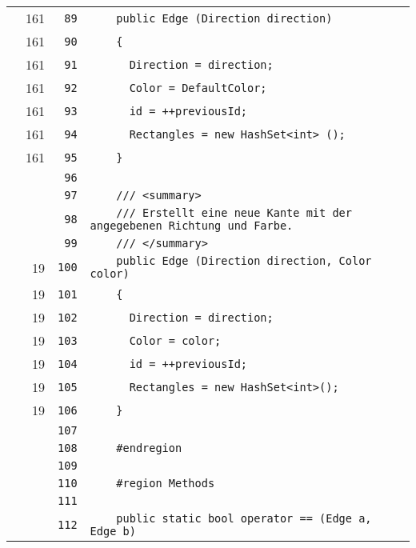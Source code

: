 \documentclass[a4paper,10pt]{article}
\begin{document}
\begin{longtable}[l]{lrrl}
\cellcolor{green} & 161 & \verb~89~ & \verb~    public Edge (Direction direction)~\\
\cellcolor{green} & 161 & \verb~90~ & \verb~    {~\\
\cellcolor{green} & 161 & \verb~91~ & \verb~      Direction = direction;~\\
\cellcolor{green} & 161 & \verb~92~ & \verb~      Color = DefaultColor;~\\
\cellcolor{green} & 161 & \verb~93~ & \verb~      id = ++previousId;~\\
\cellcolor{green} & 161 & \verb~94~ & \verb~      Rectangles = new HashSet<int> ();~\\
\cellcolor{green} & 161 & \verb~95~ & \verb~    }~\\
\cellcolor{gray} &  & \verb~96~ & \verb~~\\
\cellcolor{gray} &  & \verb~97~ & \verb~    /// <summary>~\\
\cellcolor{gray} &  & \verb~98~ & \verb~    /// Erstellt eine neue Kante mit der angegebenen Richtung und Farbe.~\\
\cellcolor{gray} &  & \verb~99~ & \verb~    /// </summary>~\\
\cellcolor{green} & 19 & \verb~100~ & \verb~    public Edge (Direction direction, Color color)~\\
\cellcolor{green} & 19 & \verb~101~ & \verb~    {~\\
\cellcolor{green} & 19 & \verb~102~ & \verb~      Direction = direction;~\\
\cellcolor{green} & 19 & \verb~103~ & \verb~      Color = color;~\\
\cellcolor{green} & 19 & \verb~104~ & \verb~      id = ++previousId;~\\
\cellcolor{green} & 19 & \verb~105~ & \verb~      Rectangles = new HashSet<int>();~\\
\cellcolor{green} & 19 & \verb~106~ & \verb~    }~\\
\cellcolor{gray} &  & \verb~107~ & \verb~~\\
\cellcolor{gray} &  & \verb~108~ & \verb~    #endregion~\\
\cellcolor{gray} &  & \verb~109~ & \verb~~\\
\cellcolor{gray} &  & \verb~110~ & \verb~    #region Methods~\\
\cellcolor{gray} &  & \verb~111~ & \verb~~\\
\cellcolor{gray} &  & \verb~112~ & \verb~    public static bool operator == (Edge a, Edge b)~\\

\end{longtable}
\end{document}
